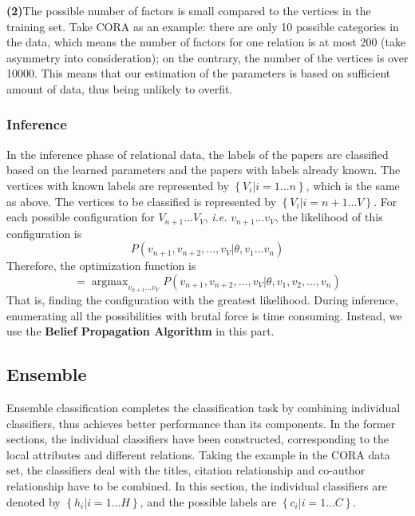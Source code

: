 \documentclass{sig-alternate}
\begin{document}
\textbf{(2)}The possible number of factors is small compared to the vertices in the training set. Take CORA as an example: there are only 10 possible categories in the data, which means the number of factors for one relation is at most 200 (take asymmetry into consideration); on the contrary, the number of the vertices is over 10000. This means that our estimation of the parameters is based on sufficient amount of data, thus being unlikely to overfit.

\subsubsection{Inference}
In the inference phase of relational data, the labels of the papers are classified based on the learned parameters and the papers with labels already known. The vertices with known labels are represented by $\left \{ V_{i}|i=1...n \right \}$, which is the same as above. The vertices to be classified is represented by $\left \{ V_{i}|i=n+1...V \right \}$. For each possible configuration for $V_{n+1}...V_{V}$, \emph{i.e.} $v_{n+1}...v_{V}$, the likelihood of this configuration is \begin{displaymath}P(v_{n+1},v_{n+2},...,v_V|\theta,v_{1}...v_{n})\end{displaymath} Therefore, the optimization function is \begin{displaymath}[v_{n+1},...,v_{V}]=\mathop{\arg\max}_{v_{n+1}...v_{V}}P(v_{n+1},v_{n+2},...,v_V|\theta,v_1,v_2,...,v_n)\end{displaymath} That is, finding the configuration with the greatest likelihood. During inference, enumerating all the possibilities with brutal force is time consuming. Instead, we use the \textbf{Belief Propagation Algorithm} in this part.

\subsection{Ensemble}
Ensemble classification completes the classification task by combining individual classifiers, thus achieves better performance than its components. In the former sections, the individual classifiers have been constructed, corresponding to the local attributes and different relations. Taking the example in the CORA data set, the classifiers deal with the titles, citation relationship and co-author relationship have to be combined. In this section, the individual classifiers are denoted by $\left\{ h_{i}|i=1...H \right\}$, and the possible labels are $\left\{ c_{i}|i=1...C \right\}$.
\end{document}
